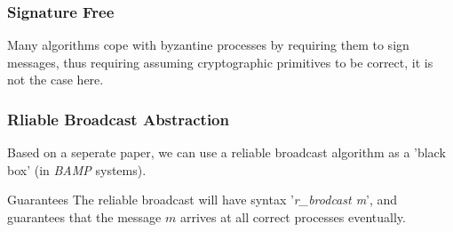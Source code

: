 \begin{frame}
    \frametitle{Signature Free}
    Many algorithms cope with byzantine processes by requiring them to sign messages,
    thus requiring assuming cryptographic primitives to be correct, it is not the case here.
\end{frame}

\begin{frame}
    \frametitle{Rliable Broadcast Abstraction}
    Based on a seperate paper, we can use a reliable broadcast algorithm as a 'black box' (in \emph{BAMP} systems).
    \begin{block}{Guarantees}
        The reliable broadcast will have syntax '\emph{r\_brodcast m}', and guarantees
        that the message $m$ arrives at all correct processes eventually.
    \end{block}
\end{frame}

